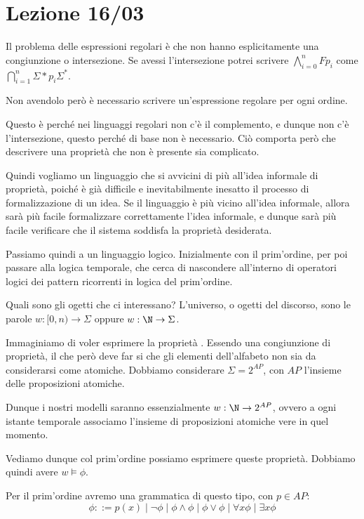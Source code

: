 \chapter{Lezione 16/03}

Il problema delle espressioni regolari è che non hanno esplicitamente una congiunzione o intersezione.
Se avessi l'intersezione potrei scrivere \(\bigwedge_{i=0}^n F p_i\) come \(\bigcap_{i=1}^n \Sigma* p_i \Sigma^*\).

Non avendolo però è necessario scrivere un'espressione regolare per ogni ordine.

Questo è perché nei linguaggi regolari non c'è il complemento, e dunque non c'è l'intersezione, questo perché di base non è necessario.
Ciò comporta però che descrivere una proprietà che non è presente sia complicato.

Quindi vogliamo un linguaggio che si avvicini di più all'idea informale di proprietà, poiché è già difficile e inevitabilmente inesatto il processo di formalizzazione di un idea.
Se il linguaggio è più vicino all'idea informale, allora sarà più facile formalizzare correttamente l'idea informale, e dunque sarà più facile verificare che il sistema soddisfa la proprietà desiderata.

Passiamo quindi a un linguaggio logico. Inizialmente con il prim'ordine, per poi passare alla logica temporale, che cerca di nascondere all'interno di operatori logici dei pattern ricorrenti in logica del prim'ordine.

Quali sono gli ogetti che ci interessano? L'universo, o ogetti del discorso, sono le parole \(w: [0,n)\to \Sigma\) oppure \(w: \N \to \Sigma\).

Immaginiamo di voler esprimere la proprietà .
Essendo una congiunzione di proprietà, il che però deve far si che gli elementi dell'alfabeto non sia da considerarsi come atomiche.
Dobbiamo considerare \(\Sigma = 2^{AP}\), con \(AP\) l'insieme delle proposizioni atomiche.


Dunque i nostri modelli saranno essenzialmente \(w:\N \to 2^{AP}\), ovvero a ogni istante temporale associamo l'insieme di proposizioni atomiche vere in quel momento.

Vediamo dunque col prim'ordine possiamo esprimere queste proprietà.
Dobbiamo quindi avere \(w \models \phi\).

Per il prim'ordine avremo una grammatica di questo tipo, con \(p \in AP\):
\[\phi ::= p(x) \mid \neg \phi \mid \phi \land \phi \mid \phi \lor \phi\mid \forall x \phi \mid \exists x \phi\]

